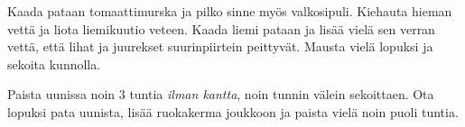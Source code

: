 \begin{recipe}
{        Kaada pataan tomaattimurska ja pilko sinne myös valkosipuli. Kiehauta
        hieman vettä ja liota liemikuutio veteen. Kaada liemi pataan ja lisää vielä sen 
        verran vettä, että lihat ja juurekset suurinpiirtein peittyvät. Mausta vielä lopuksi 
        ja sekoita kunnolla.

        Paista uunissa noin 3 tuntia \emph{ilman kantta}, noin tunnin välein sekoittaen. Ota lopuksi 
        pata uunista, lisää ruokakerma joukkoon ja paista vielä noin puoli tuntia.
    }

    
\end{recipe}
